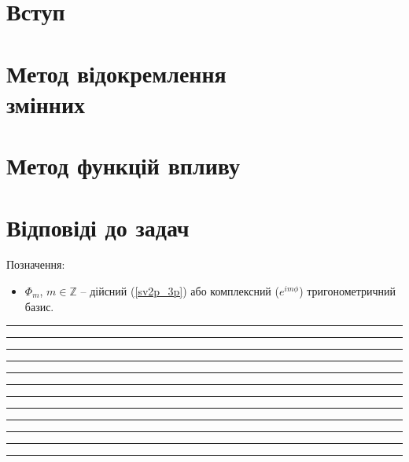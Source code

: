 \documentclass[10pt,a5paper,twoside,openany]{vpcku}
\theoremstyle{example}
\theoremstyle{task}
\newcommand{\sepsol}{\medskip\hrule\medskip}  %
\newcommand{\showsol}[1]{}                   %
\begin{document}

\tableofcontents


\chapter*{Вступ}
    \bigskip     \showsol{class_s}
\chapter[Метод відокремлення змінних]{Метод відокремлення \\ змінних}
       \bigskip        \showsol{SL_s}
  \bigskip   \showsol{sepvar1_s}
  \bigskip   \showsol{sepvar2_s}
 \bigskip  \showsol{sepvar2p_s}
 \bigskip  \showsol{sepvar3s_s}
 \bigskip  \showsol{sepvar3c_s}
\chapter{Метод функцій впливу}

   \bigskip    \showsol{genfun_s}
   \bigskip    \showsol{GFdiff_s}
  \bigskip   \showsol{GFwave1_s}
  \bigskip   \showsol{GFwave2_s}
    \bigskip     \showsol{GFell_s}

\newpage
\chapter*{Відповіді до задач}
{\small
Позначення:
\begin{itemize}
\item
$\Phi_m$, $m\in\mathbb{Z}$ -- дійсний (\ref{sv2p_3p}) або комплексний ($e^{im\phi}$) тригонометричний базис.
\end{itemize}
\sepsol  \sepsol  \sepsol  \sepsol  \sepsol  \sepsol  \sepsol  \sepsol  \sepsol  \sepsol  \sepsol  \sepsol 
}



\end{document}
